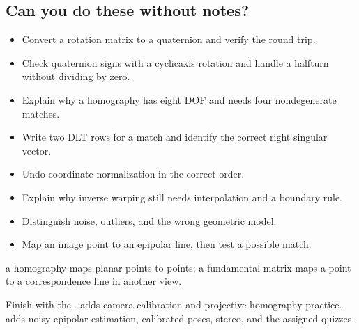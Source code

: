\documentclass[letterpaper,11pt,english,openany,oneside]{jupyterBook}
\begin{document}
\subsection{Can you do these without notes?}
\label{\detokenize{lectures/lecture02/review:can-you-do-these-without-notes}}\begin{itemize}
\item {}
\sphinxAtStartPar
Convert a rotation matrix to a quaternion and verify the round trip.

\item {}
\sphinxAtStartPar
Check quaternion signs with a cyclic\sphinxhyphen{}axis rotation and handle a half\sphinxhyphen{}turn without dividing by zero.

\item {}
\sphinxAtStartPar
Explain why a homography has eight DOF and needs four nondegenerate matches.

\item {}
\sphinxAtStartPar
Write two DLT rows for a match and identify the correct right singular vector.

\item {}
\sphinxAtStartPar
Undo coordinate normalization in the correct order.

\item {}
\sphinxAtStartPar
Explain why inverse warping still needs interpolation and a boundary rule.

\item {}
\sphinxAtStartPar
Distinguish noise, outliers, and the wrong geometric model.

\item {}
\sphinxAtStartPar
Map an image point to an epipolar line, then test a possible match.

\end{itemize}

\sphinxAtStartPar
{} a homography maps planar points to points; a fundamental matrix maps a point to a correspondence line in another view.

\sphinxAtStartPar
Finish with the {\hyperref[\detokenize{lectures/lecture02/tldr::doc}]{}}. {\hyperref[\detokenize{lectures/lecture03/index::doc}]{}} adds camera calibration and projective homography practice. {\hyperref[\detokenize{lectures/lecture04/index::doc}]{}} adds noisy epipolar estimation, calibrated poses, stereo, and the assigned quizzes.
\end{document}
